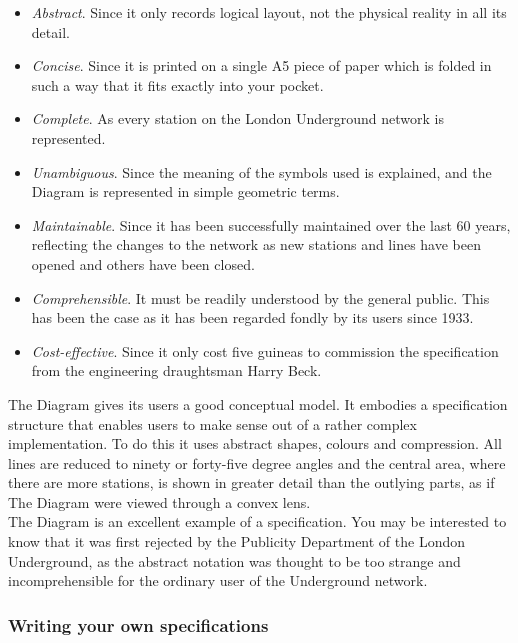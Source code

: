 \begin{itemize}
\item
{\em Abstract}. Since it only records logical layout, not the physical 
reality in all its detail.

\item
{\em Concise}. Since it is printed on a single A5 piece of paper which is 
folded in such a way that it fits exactly into your pocket. 

\item
{\em Complete}. As every station on the London Underground network is 
represented.

\item
{\em Unambiguous}. Since the meaning of the symbols used is explained, and
the Diagram is represented in simple geometric terms. 

\item
{\em Maintainable}. Since it has been successfully maintained over the last
60 years, reflecting the changes to the network as new stations and lines 
have been opened and others have been closed. 

\item
{\em Comprehensible}. It must be readily understood by the general public. 
This has been the case as it has been regarded fondly by its users since 
1933. 

\item
{\em Cost-effective}. Since it only cost five guineas to commission the
specification from the engineering draughtsman Harry Beck. 
\end{itemize}

The Diagram gives its users a good conceptual model. It embodies a specification
structure that enables users to make sense out of a rather complex implementation. 
To do this it uses abstract shapes, colours and compression. All lines
are reduced to ninety or forty-five degree angles and the central area, 
where there are more stations, is shown in greater detail than the outlying 
parts, as if The Diagram were viewed through a convex lens. \\

The Diagram is an excellent example of a specification. You may be 
interested to know that it was first rejected by the Publicity Department of 
the London Underground, as the abstract notation was thought to be too strange
and incomprehensible for the ordinary user of the Underground network. 

\subsubsection{Writing your own specifications} 

